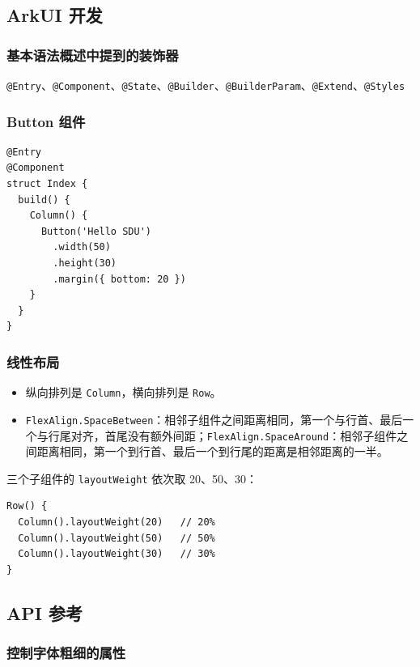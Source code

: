 \documentclass[a4paper, 12pt, linespread=1.35]{ctexart}   %
\newcommand{\keepwithnext}{\par\nobreak}
\begin{document}
\subsection{ArkUI 开发}

\subsubsection{基本语法概述中提到的装饰器}

\texttt{@Entry}、\texttt{@Component}、\texttt{@State}、\texttt{@Builder}、\texttt{@BuilderParam}、\texttt{@Extend}、\texttt{@Styles}

\subsubsection{Button 组件}

\begin{lstlisting}
@Entry
@Component
struct Index {
  build() {
    Column() {
      Button('Hello SDU')
        .width(50)
        .height(30)
        .margin({ bottom: 20 })
    }
  }
}
\end{lstlisting}

\subsubsection{线性布局}

\begin{itemize}
  \item 纵向排列是 \texttt{Column}，横向排列是 \texttt{Row}。
  \item \texttt{FlexAlign.SpaceBetween}：相邻子组件之间距离相同，第一个与行首、最后一个与行尾对齐，首尾没有额外间距；\texttt{FlexAlign.SpaceAround}：相邻子组件之间距离相同，第一个到行首、最后一个到行尾的距离是相邻距离的一半。
\end{itemize}
\Needspace*{92pt}
三个子组件的 \texttt{layoutWeight} 依次取 20、50、30：\keepwithnext
\begin{lstlisting}
Row() {
  Column().layoutWeight(20)   // 20%
  Column().layoutWeight(50)   // 50%
  Column().layoutWeight(30)   // 30%
}
\end{lstlisting}

\subsection{API 参考}

\subsubsection{控制字体粗细的属性}
\end{document}
